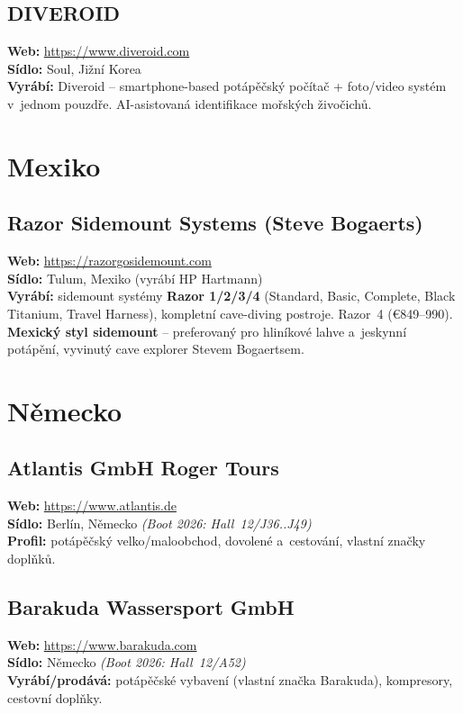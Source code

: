 \documentclass[11pt,a4paper]{article}
\begin{document}
\subsection{DIVEROID}
\textbf{Web:} \url{https://www.diveroid.com} \\
\textbf{Sídlo:} Soul, Jižní Korea \\
\textbf{Vyrábí:} Diveroid -- smartphone-based potápěčský počítač + foto/video systém v~jednom pouzdře. AI-asistovaná identifikace mořských živočichů.

\section{Mexiko}

\subsection{Razor Sidemount Systems (Steve Bogaerts)}
\textbf{Web:} \url{https://razorgosidemount.com} \\
\textbf{Sídlo:} Tulum, Mexiko (vyrábí HP Hartmann) \\
\textbf{Vyrábí:} sidemount systémy \textbf{Razor 1/2/3/4} (Standard, Basic, Complete, Black Titanium, Travel Harness), kompletní cave-diving postroje. Razor~4 (€849--990). \textbf{Mexický styl sidemount} -- preferovaný pro hliníkové lahve a~jeskynní potápění, vyvinutý cave explorer Stevem Bogaertsem.

\section{Německo}

\subsection{Atlantis GmbH Roger Tours}
\textbf{Web:} \url{https://www.atlantis.de} \\
\textbf{Sídlo:} Berlín, Německo \quad\emph{(Boot 2026: Hall~12/J36..J49)} \\
\textbf{Profil:} potápěčský velko/maloobchod, dovolené a~cestování, vlastní značky doplňků.

\subsection{Barakuda Wassersport GmbH}
\textbf{Web:} \url{https://www.barakuda.com} \\
\textbf{Sídlo:} Německo \quad\emph{(Boot 2026: Hall~12/A52)} \\
\textbf{Vyrábí/prodává:} potápěčské vybavení (vlastní značka Barakuda), kompresory, cestovní doplňky.
\end{document}
